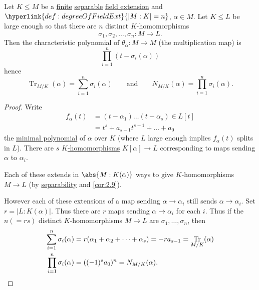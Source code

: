 \documentclass{article}
\DeclareMathOperator{\Tr}{Tr}
\begin{document}
\begin{nthm}\label{thm:2.20}
    Let $K \leq M$ be a \hyperlink{def:degreeOfFieldExt}{finite} \hyperlink{def:separableExt}{separable} \hyperlink{def:fieldExt}{field extension} and $\hyperlink{def:degreeOfFieldExt}{|M:K| = n}$, $\alpha \in M$.
    Let $K \leq L$ be large enough so that there are $n$ distinct $K$-homomorphisms
    \begin{equation*}
        \sigma_1, \sigma_2, \dotsc, \sigma_n: M \longrightarrow L.
    \end{equation*}
    Then the characteristic polynomial of $\theta_\alpha:M \to M$ (the multiplication map) is
    \begin{equation*}
        \prod_{i=1}^n (t-\sigma_i(\alpha))
    \end{equation*}
    hence
    \begin{equation*}
        \Tr_{M/K} (\alpha) = \sum_{i=1}^n \sigma_i(\alpha) \qquad \text{and} \qquad N_{M/K}(\alpha) = \prod_{i=1}^n \sigma_i(\alpha).
    \end{equation*}
\end{nthm}

\begin{proof}
    Write
    \begin{align*}
        f_\alpha(t) &= (t-\alpha_1) \dotsc (t-\alpha_s) \in L[t] \\
                    &= t^s + a_{s-1} t^{s-1} + \dotsc + a_0
    \end{align*}
    the \hyperlink{def:minimalPoly}{minimal polynomial} of $\alpha$ over $K$ (where $L$ large enough implies $f_\alpha(t)$ splits in $L$).
    There are $s$ \hyperlink{def:homo}{$K$-homomorphisms} $K[\alpha] \to L$ corresponding to maps sending $\alpha$ to $\alpha_i$.

    Each of these extends in $\abs{M:K(\alpha)}$ ways to give $K$-homomorphisms $M \to L$ (by \hyperlink{def:separableExt}{separability} and \cref{cor:2.9}).

    However each of these extensions of a map sending $\alpha \to \alpha_i$ still sends $\alpha \to \alpha_i$.
    Set $r = |L:K(\alpha)|$. Thus there are $r$ maps sending $\alpha \to \alpha_i$ for each $i$.
    Thus if the $n (=rs)$ distinct $K$-homomorphisms $M \to L$ are $\sigma_1, \dotsc, \sigma_n$, then
    \begin{align*}
        \sum_{i=1}^n \sigma_i(\alpha) &= r(\alpha_1 + \alpha_2 + \dotsb + \alpha_s) = -r a_{s-1} = \Tr_{M/K}(\alpha) \\
        \prod_{i=1}^n \sigma_i(\alpha) &= ((-1)^s a_0)^n = N_{M/K}(\alpha). \qedhere
    \end{align*}
\end{proof}
\end{document}
